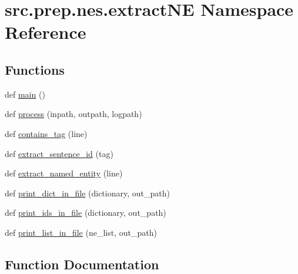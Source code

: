 \hypertarget{namespacesrc_1_1prep_1_1nes_1_1extract_n_e}{}\section{src.\+prep.\+nes.\+extract\+NE Namespace Reference}
\label{namespacesrc_1_1prep_1_1nes_1_1extract_n_e}
\subsection*{Functions}
\begin{DoxyCompactItemize}
\item 
def \hyperlink{namespacesrc_1_1prep_1_1nes_1_1extract_n_e_a84412289c2c975f347ba64d3018559b1}{main} ()
\item 
def \hyperlink{namespacesrc_1_1prep_1_1nes_1_1extract_n_e_aaa0298e3a3b9eb423a62d79d4a9e653c}{process} (inpath, outpath, logpath)
\item 
def \hyperlink{namespacesrc_1_1prep_1_1nes_1_1extract_n_e_a6a6a278ba48e7ff64f9d1085c42476cd}{contains\+\_\+tag} (line)
\item 
def \hyperlink{namespacesrc_1_1prep_1_1nes_1_1extract_n_e_abc6c1075c31bd0b19a60c1f4659fbd70}{extract\+\_\+sentence\+\_\+id} (tag)
\item 
def \hyperlink{namespacesrc_1_1prep_1_1nes_1_1extract_n_e_a571fd2bd65f61b880e1646a15f6ba2f9}{extract\+\_\+named\+\_\+entity} (line)
\item 
def \hyperlink{namespacesrc_1_1prep_1_1nes_1_1extract_n_e_ab3b2842e8b6fe53cf46b75e12624d2fb}{print\+\_\+dict\+\_\+in\+\_\+file} (dictionary, out\+\_\+path)
\item 
def \hyperlink{namespacesrc_1_1prep_1_1nes_1_1extract_n_e_a1fd11033f26e5f417a39fe0b098a149a}{print\+\_\+ids\+\_\+in\+\_\+file} (dictionary, out\+\_\+path)
\item 
def \hyperlink{namespacesrc_1_1prep_1_1nes_1_1extract_n_e_a10dbcb75faed1a45e833b1784ae003d7}{print\+\_\+list\+\_\+in\+\_\+file} (ne\+\_\+list, out\+\_\+path)
\end{DoxyCompactItemize}


\subsection{Function Documentation}

